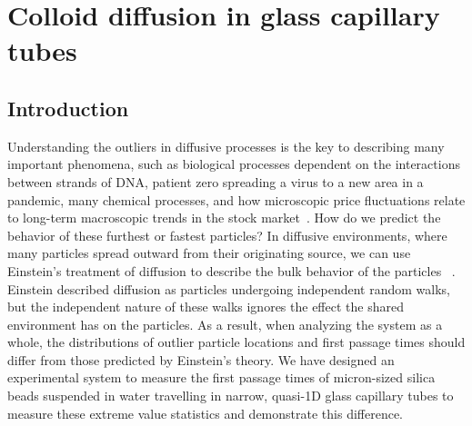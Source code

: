 
\chapter{Colloid diffusion in glass capillary tubes}
\label{ch3_extras}

\section{Introduction}
Understanding the outliers in diffusive processes is the key to describing many important phenomena, such as biological processes dependent on the interactions between strands of DNA, patient zero spreading a virus to a new area in a pandemic, many chemical processes, and how microscopic price fluctuations relate to long-term macroscopic trends in the stock market~\cite{zhang_first-passage_2016, hufnagel_forecast_2004, redner_8_2001, liu_anchoring_2017}. How do we predict the behavior of these furthest or fastest particles? In diffusive environments, where many particles spread outward from their originating source, we can use Einstein’s treatment of diffusion to describe the bulk behavior of the particles~ \cite{einstein_uber_1905, von_smoluchowski_zur_1906}. Einstein described diffusion as particles undergoing independent random walks, but the independent nature of these walks ignores the effect the shared environment has on the particles. As a result, when analyzing the system as a whole, the distributions of outlier particle locations and first passage times should differ from those predicted by Einstein’s theory. We have designed an experimental system to measure the first passage times of micron-sized silica beads suspended in water travelling in narrow, quasi-1D glass capillary tubes to measure these extreme value statistics and demonstrate this difference.
 

